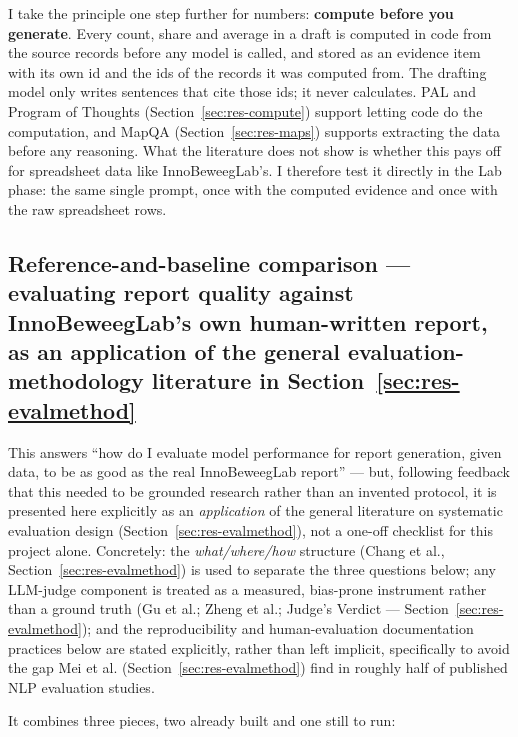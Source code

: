 I take the principle one step further for numbers: \textbf{compute before you generate}. Every count, share and average in a draft is computed in code from the source records before any model is called, and stored as an evidence item with its own id and the ids of the records it was computed from. The drafting model only writes sentences that cite those ids; it never calculates. PAL and Program of Thoughts (Section~\ref{sec:res-compute}) support letting code do the computation, and MapQA (Section~\ref{sec:res-maps}) supports extracting the data before any reasoning. What the literature does not show is whether this pays off for spreadsheet data like InnoBeweegLab's. I therefore test it directly in the Lab phase: the same single prompt, once with the computed evidence and once with the raw spreadsheet rows.



\subsection{Reference-and-baseline comparison — evaluating report quality against InnoBeweegLab's own human-written report, as an application of the general evaluation-methodology literature in \texorpdfstring{Section~\ref{sec:res-evalmethod}}{Section 4.7}}\label{sec:m-reference}

This answers \textquotedblleft{}how do I evaluate model performance for report generation, given data, to be as good as the real InnoBeweegLab report\textquotedblright{} — but, following feedback that this needed to be grounded research rather than an invented protocol, it is presented here explicitly as an \textit{application} of the general literature on systematic evaluation design (Section~\ref{sec:res-evalmethod}), not a one-off checklist for this project alone. Concretely: the \textit{what/where/how} structure (Chang et al., Section~\ref{sec:res-evalmethod}) is used to separate the three questions below; any LLM-judge component is treated as a measured, bias-prone instrument rather than a ground truth (Gu et al.; Zheng et al.; Judge's Verdict — Section~\ref{sec:res-evalmethod}); and the reproducibility and human-evaluation documentation practices below are stated explicitly, rather than left implicit, specifically to avoid the gap Mei et al. (Section~\ref{sec:res-evalmethod}) find in roughly half of published NLP evaluation studies.



It combines three pieces, two already built and one still to run:



